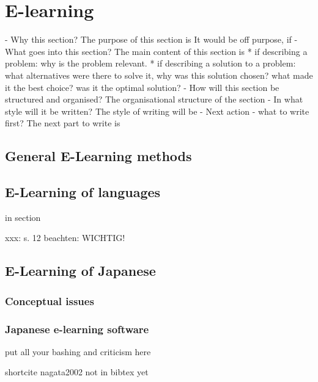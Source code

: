 \chapter{E-learning}
\label{chap:elearning}

- Why this section? 
  The purpose of this section is 
  It would be off purpose, if 
- What goes into this section?
  The main content of this section is 
  * if describing a problem: why is the problem relevant.
  * if describing a solution to a problem: what alternatives were
    there to solve it, why was this solution chosen? 
    what made it the best choice? was it the optimal solution?
- How will this section be structured and organised?
  The organisational structure of the section 
- In what style will it be written?
  The style of writing will be 
- Next action - what to write first?
  The next part to write is

\section{General E-Learning methods}
\section{E-Learning of languages}


in section 

xxx: s. 12 beachten: WICHTIG!

\section{E-Learning of Japanese}
\subsection{Conceptual issues}
\subsection{Japanese e-learning software}
put all your bashing and criticism here


shortcite nagata2002 not in bibtex yet

